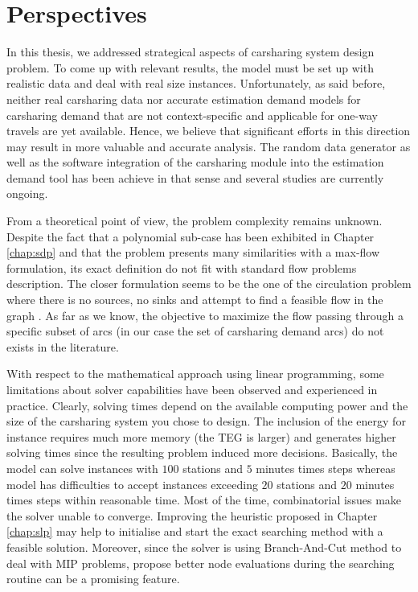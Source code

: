 \section{Perspectives}
In this thesis, we addressed strategical aspects of carsharing system design problem.
To come up with relevant results, the model must be set up with realistic data and deal with real size instances.
Unfortunately, as said before, neither real carsharing data nor accurate estimation demand models for carsharing demand that are not context-specific and applicable for one-way travels are yet available.
Hence, we believe that significant efforts in this direction may result in more valuable and accurate analysis.
The random data generator as well as the software integration of the carsharing module into the estimation demand tool has been achieve in that sense and several studies are currently ongoing.


\medskip
From a theoretical point of view, the {\SDP} problem complexity remains unknown.
Despite the fact that a polynomial sub-case has been exhibited in Chapter \ref{chap:sdp} and that the problem presents many similarities with a max-flow formulation, its exact definition do not fit with standard flow problems description.
The closer formulation seems to be the one of the circulation problem where there is no sources, no sinks and attempt to find a feasible flow in the graph \cite{ahuja_network_1993}.
As far as we know, the objective to maximize the flow passing through a specific subset of arcs (in our case the set of carsharing demand arcs) do not exists in the literature.
\medskip


With respect to the mathematical approach using linear programming, some limitations about solver capabilities have been observed and experienced in practice.
Clearly, solving times depend on the available computing power and the size of the carsharing system you chose to design.
The inclusion of the energy for instance requires much more memory (the TEG is larger) and generates higher solving times since the resulting problem induced more decisions.
Basically, the {\SDP} model can solve instances with $100$ stations and $5$ minutes times steps whereas {\ENERGY} model has difficulties to accept instances exceeding $20$ stations and $20$ minutes times steps within reasonable time.
Most of the time, combinatorial issues make the solver unable to converge.
Improving the heuristic proposed in Chapter \ref{chap:slp} may help to initialise and start the exact searching method with a feasible solution.
Moreover, since the solver is using Branch-And-Cut method to deal with MIP problems, propose better node evaluations during the searching routine can be a promising feature.



